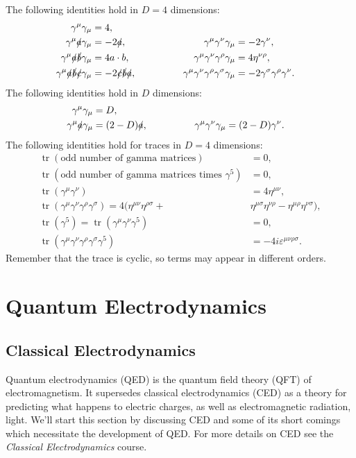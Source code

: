 \documentclass[fleqn]{NotesClass}
\newcommand*{\course}[1]{\textit{#1}}
\newcommand{\minkowskiMetric}{\eta}
\DeclareMathOperator{\tr}{tr}
\begin{document}
    The following identities hold in \(D = 4\) dimensions:
    \begin{alignat}{3}
        \gamma^\mu \gamma_\mu &= 4,\\
        \gamma^\mu \slashed{a} \gamma_\mu &= -2\slashed{a}, \qquad\qquad & \gamma^\mu \gamma^\nu \gamma_\mu &= -2\gamma^\nu,\\
        \gamma^\mu \slashed{a} \slashed{b} \gamma_\mu &= 4 a \cdot b, \qquad\qquad & \gamma^\mu \gamma^\nu \gamma^\rho \gamma_\mu &= 4\minkowskiMetric^{\nu\rho},\\
        \gamma^\mu \slashed{a} \slashed{b} \slashed{c} \gamma_\mu &= -2 \slashed{c}\slashed{b}\slashed{a}, \qquad\qquad & \gamma^\mu \gamma^\nu \gamma^\rho \gamma^\sigma \gamma_\mu &= -2 \gamma^\sigma \gamma^\rho \gamma^\nu.
    \end{alignat}
    The following identities hold in \(D\) dimensions:
    \begin{alignat}{3}
        \gamma^\mu \gamma_\mu &= D,\\
        \gamma^\mu \slashed{a} \gamma_\mu &= (2 - D)\slashed{a}, \qquad\qquad & \gamma^\mu \gamma^\nu \gamma_\mu &= (2 - D) \gamma^\nu.
    \end{alignat}
    The following identities hold for traces in \(D = 4\) dimensions:
    \begin{align}
        \tr(\text{odd number of gamma matrices}) &= 0,\\
        \tr(\text{odd number of gamma matrices times } \gamma^5) &= 0,\\
        \tr(\gamma^\mu \gamma^\nu) &= 4\minkowskiMetric^{\mu\nu},\\
        \tr(\gamma^\mu \gamma^\nu \gamma^\rho \gamma^\sigma) = 4(\minkowskiMetric^{\mu\nu}\minkowskiMetric^{\rho\sigma} + {}&\minkowskiMetric^{\mu\sigma}\minkowskiMetric^{\nu\rho} - \minkowskiMetric^{\mu\rho}\minkowskiMetric^{\nu\sigma}),\\
        \tr(\gamma^5) = \tr(\gamma^\mu \gamma^\nu \gamma^5) &= 0,\\
        \tr(\gamma^\mu\gamma^\nu\gamma^\rho\gamma^\sigma\gamma^5) &= -4i\varepsilon^{\mu\nu\rho\sigma}.
    \end{align}
    Remember that the trace is cyclic, so terms may appear in different orders.
    
    \part{Quantum Electrodynamics}
    \chapter{Classical Electrodynamics}
    Quantum electrodynamics (QED) is the quantum field theory (QFT) of electromagnetism.
    It supersedes classical electrodynamics (CED) as a theory for predicting what happens to electric charges, as well as electromagnetic radiation, light.
    We'll start this section by discussing CED and some of its short comings which necessitate the development of QED.
    For more details on CED see the \course{Classical Electrodynamics} course.
    
\end{document}
